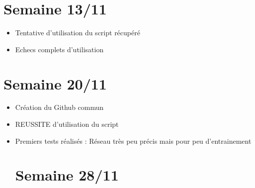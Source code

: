 \documentclass{report}
\begin{document}
		\section*{Semaine 13/11}
			\begin{itemize}
				\item Tentative d'utilisation du script récupéré
				\item Echecs complets d'utilisation
			\end{itemize}
		\section*{Semaine 20/11}
			\begin{itemize}
				\item Création du Github commun
				\item REUSSITE d'utilisation du script
				\item Premiers tests réalisés : Réseau très peu précis mais pour peu d'entrainement
		\section*{Semaine 28/11}
			\end{itemize}
	
\end{document}
